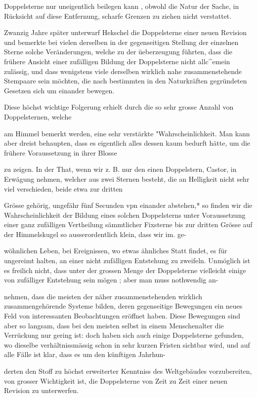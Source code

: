 \documentclass[10pt,a4paper]{article}
\begin{document}
Doppelsterne nur uneigentlich beilegen kann , obwohl die Natur der Sache, in Rücksicht auf diese Entfernung, scharfe Grenzen zu ziehen nicht verstattet.

Zwanzig Jahre später unterwarf Hekschel die Doppelsterne einer neuen Revision und bemerkte bei vielen derselben in der gegenseitigen Stellung der einzelnen Sterne solche Veränderungen, welche zu der üeberzeugung führten, dass die frühere Ansicht einer zufälligen Bildung der Doppelsterne nicht allc\textasciicircum{}emein zulässig, und dass wenigstens viele derselben wirklich nahe zusammenstehende Stempaare sein möchten, die nach bestimmten in den Naturkräften gegründeten Gesetzen sich um einander bewegen.

Diese höchst wichtige Folgerung erhielt durch die so sehr grosse Anzahl von Doppelsternen, welche

am Himmel bemerkt werden, eine sehr verstärkte "Wahrscheinlichkeit. Man kann aber dreist behaupten, dass es eigentlich alles dessen kaum bedurft hätte, um die frühere Voraussetzung in ihrer Blosse

zu zeigen. In der That, wenn wir z. B. nur den einen Doppelstern, Castor, in Erwägung nehmen, welcher aus zwei Sternen besteht, die an Helligkeit nicht sehr viel verschieden, beide etwa zur dritten

Grösse gehörig, ungefähr fünf Secunden vpn einander abstehen,* so finden wir die Wahrscheinlichkeit der Bildung eines solchen Doppelsterns unter Voraussetzung einer ganz zufälligen Vertheilung sämmtlicher Fixsterne bis zur dritten Grösse auf der Himmelskugel so ausserordentlich klein, dass wir im. ge-

wöhnlichen Leben, bei Ereignissen, wo etwas ähnliches Statt findet, es für ungereimt halten, an einer nicht zufälligen Entstehung zu zweifeln. Unmöglich ist es freilich nicht, dass unter der grossen Menge der Doppelsterne vielleicht einige von zufälliger Entstehung sein mögen ; aber man muss nothwendig an-

nehmen, dass die meisten der näher zusammenstehenden wirklich zusammengehörende Systeme bilden, deren gegenseitige Bewegungen ein neues Feld von interessanten Beobachtungen eröffnet haben. Diese Bewegungen sind aber so langsam, dass bei den meisten selbst in einem Menschenalter die Verrückung nur gering ist: doch haben sich auch einige Doppelsterne gefunden, wo dieselbe verhältnissmässig schon in sehr kurzen Fristen sichtbar wird, und auf alle Fälle ist klar, dass es um den künftigen Jahrhun-

derten den Stoff zu höchst erweiterter Kenntniss des Weltgebäudes vorzubereiten, von grosser Wichtigkeit ist, die Doppelsterne von Zeit zu Zeit einer neuen Revision zu unterwerfen.
\end{document}
